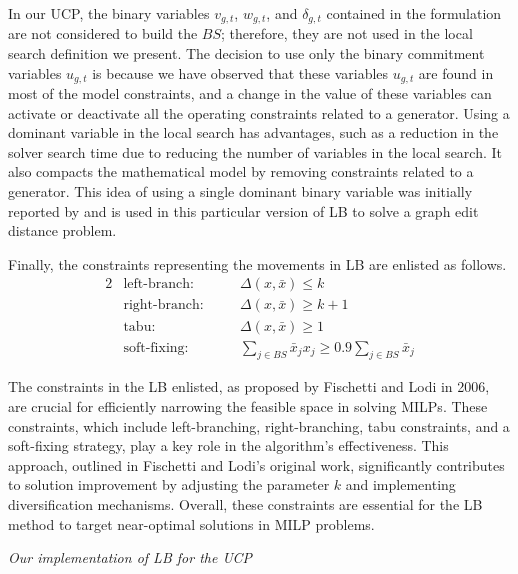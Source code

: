 In our UCP, the binary variables $v_{g,t}$, $w_{g,t}$, and $\delta_{g,t}$ contained in the formulation are not considered to build the $\textit{BS}$; therefore, they are not used in the local search definition we present. The decision to use only the binary commitment variables $u_{g,t}$ is because we have observed that these variables $u_{g,t}$ are found in most of the model constraints, and a change in the value of these variables can activate or deactivate all the operating constraints related to a generator. Using a dominant variable in the local search has advantages, such as a reduction in the solver search time due to reducing the number of variables in the local search. It also compacts the mathematical model by removing constraints related to a generator. This idea of using a single dominant binary variable was initially reported by \citet{Darwiche2019} and is used in this particular version of LB to solve a graph edit distance problem.



Finally, the constraints representing the movements in LB are enlisted as follows.
\begingroup                 %
\allowdisplaybreaks
\begin{alignat}{2}
&\text{left-branch}: &&  \Delta(x,\bar{x})\leq k \label{eq:leftbranch}\\
& \text{right-branch}: \quad && \Delta(x,\bar{x})\geq k+1 \label{eq:rightbranches}\\
& \text{tabu}:&&  \Delta(x,\bar{x})\geq 1 \label{eq:tabu}\\
& \text{soft-fixing}: &&  \sum\limits_{j\in\textit{BS}}\bar{x}_j x_j \geq 0.9 \sum\limits_{j\in\textit{BS}}\bar{x}_j\label{eq:softfixing}
\end{alignat}

The constraints in the LB enlisted, as proposed by Fischetti and Lodi in 2006, are crucial for efficiently narrowing the feasible space in solving MILPs. These constraints, which include left-branching, right-branching, tabu constraints, and a soft-fixing strategy, play a key role in the algorithm's effectiveness. This approach, outlined in Fischetti and Lodi's original work, significantly contributes to solution improvement by adjusting the parameter $k$ and implementing diversification mechanisms. Overall, these constraints are essential for the LB method to target near-optimal solutions in MILP problems.

\vspace{1em}\noindent\textit{Our implementation of LB for the UCP}\\


